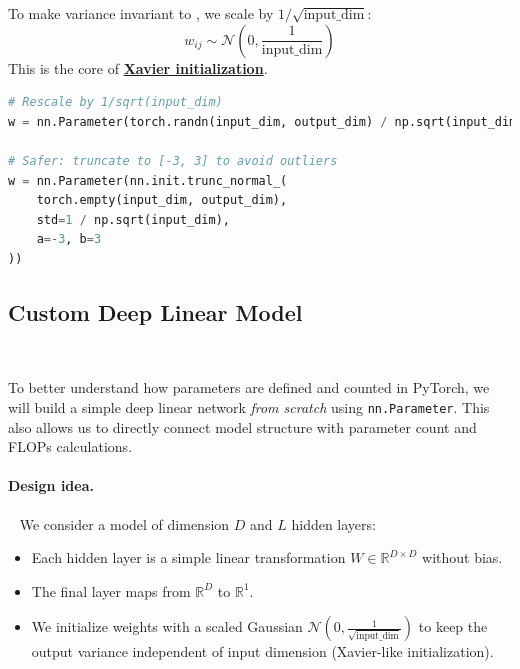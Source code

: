 To make variance invariant to , 
we scale by $1/\sqrt{\text{input\_dim}}$:
\[
w_{ij} \sim \mathcal{N}\left(0, \frac{1}{\text{input\_dim}}\right)
\]
This is the core of \textbf{\href{https://proceedings.mlr.press/v9/glorot10a/glorot10a.pdf}{Xavier initialization}}.

\begin{lstlisting}[language=Python]
# Rescale by 1/sqrt(input_dim)
w = nn.Parameter(torch.randn(input_dim, output_dim) / np.sqrt(input_dim))

# Safer: truncate to [-3, 3] to avoid outliers
w = nn.Parameter(nn.init.trunc_normal_(
    torch.empty(input_dim, output_dim),
    std=1 / np.sqrt(input_dim),
    a=-3, b=3
))
\end{lstlisting}

\clearpage
\subsection{Custom Deep Linear Model}~{}

To better understand how parameters are defined and counted in PyTorch, we will build a simple deep linear network \emph{from scratch} using \texttt{nn.Parameter}.  
This also allows us to directly connect model structure with parameter count and FLOPs calculations.

\paragraph{Design idea.}~{}  
We consider a model of dimension $D$ and $L$ hidden layers:
\begin{itemize}
    \item Each hidden layer is a simple linear transformation $W \in \mathbb{R}^{D \times D}$ without bias.
    \item The final layer maps from $\mathbb{R}^D$ to $\mathbb{R}^1$.
    \item We initialize weights with a scaled Gaussian $\mathcal{N}(0, \frac{1}{\sqrt{\text{input\_dim}}})$ to keep the output variance independent of input dimension (Xavier-like initialization).
\end{itemize}

